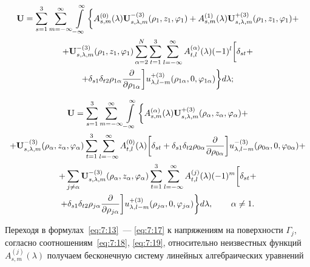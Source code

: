 \begin{multline}
{\bf{U}} = \sum\limits_{s = 1}^3 {\sum\limits_{m =  - \infty }^\infty  {\int\limits_{ - \infty }^\infty  \bigg\{  } } A_{s,m}^{(0)}(\lambda ){\bf{U}}_{s,\lambda ,m}^{ - (3)}({\rho _1},{z_1},{\varphi _1}) + A_{s,m}^{(1)}(\lambda ){\bf{U}}_{s,\lambda ,m}^{ + (3)}({\rho _1},{z_1},{\varphi _1}) + \\
+ {\bf{U}}_{s,\lambda ,m}^{ - (3)}({\rho _1},{z_1},{\varphi _1})\sum\limits_{\alpha  = 2}^N {\sum\limits_{t = 1}^3 {\sum\limits_{l =  - \infty }^\infty  {A_{t,l}^{(\alpha )}} } } (\lambda ){( - 1)^l}\bigg[{\delta _{st}} + \\
+ {\delta _{s1}}{\delta _{t2}}{\rho _{1\alpha }}\frac{\partial }{{\partial {\rho _{1\alpha }}}}\bigg]u_{\lambda ,l - m}^{ + (3)}({\rho _{1\alpha }},0,{\varphi _{1\alpha }})\bigg\} d\lambda;
\label{eq:7:16}
\end{multline}

\begin{multline}
{\bf{U}} = \sum\limits_{s = 1}^3 {\sum\limits_{m =  - \infty }^\infty  {\int\limits_{ - \infty }^\infty  \bigg\{  } } A_{s,m}^{(\alpha )}(\lambda ){\bf{U}}_{s,\lambda ,m}^{ + (3)}({\rho _\alpha },{z_\alpha },{\varphi _\alpha }) + \\
+ {\bf{U}}_{s,\lambda ,m}^{ - (3)}({\rho _\alpha },{z_\alpha },{\varphi _\alpha })\sum\limits_{t = 1}^3 {\sum\limits_{l =  - \infty }^\infty  {A_{t,l}^{(0)}} } (\lambda )\bigg[{\delta _{st}} + {\delta _{s1}}{\delta _{t2}}{\rho _{0\alpha }}\frac{\partial }{{\partial {\rho _{0\alpha }}}}\bigg]u_{\lambda ,l - m}^{ - (3)}({\rho _{0\alpha }},0,{\varphi _{0\alpha }}) + \\
+ \sum\limits_{j \ne \alpha } {{\bf{U}}_{s,\lambda ,m}^{ - (3)}} ({\rho _\alpha },{z_\alpha },{\varphi _\alpha })\sum\limits_{t = 1}^3 {\sum\limits_{l =  - \infty }^\infty  {A_{t,l}^{(j)}} } (\lambda ){( - 1)^m}\bigg[{\delta _{st}} + \\
+ {\delta _{s1}}{\delta _{t2}}{\rho _{j\alpha }}\frac{\partial }{{\partial {\rho _{j\alpha }}}}\bigg]u_{\lambda ,l - m}^{ + (3)}({\rho _{j\alpha }},0,{\varphi _{j\alpha }})\bigg\} d\lambda ,\qquad {\kern 1pt} \alpha  \ne 1.
\label{eq:7:17}
\end{multline}

Переходя в формулах~\eqref{eq:7:13}~--- \eqref{eq:7:17} к напряжениям на поверхности $\Gamma_j$, согласно соотношениям~\eqref{eq:7:18}, \eqref{eq:7:19}, относительно неизвестных функций $A_{s,m}^{(j)}(\lambda)$ получаем бесконечную систему линейных алгебраических уравнений\sloppy

